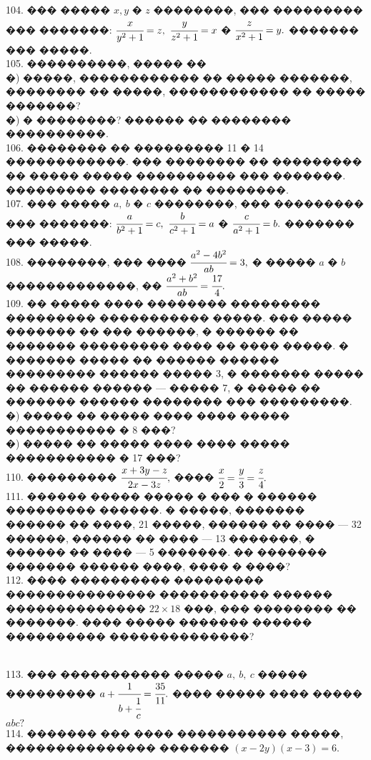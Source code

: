 \documentclass[12pt]{article}
\begin{document}
104. ��� ����� $x, y$ � $z$ ��������, ��� ��������� ��� �������: $\cfrac{x}{y^2+1}=z,\ \cfrac{y}{z^2+1}=x$ � $\cfrac{z}{x^2+1}=y.$ ������� ��� �����.\\
105. ����������, ����� ��\\
�) �����, ������������ �� ����� �������, �������� �� �����, ������������ �� ����� �������?\\
�) � ��������? ������ �� �������� ����������.\\
106. �������� �� ��������� 11 � 14 ������������. ��� �������� �� ��������� �� ����� ����� ���������� ��� �������. ��������� �������� �� ��������.\\
107. ��� ����� $a,\ b$ � $c$ ��������, ��� ��������� ��� �������: $\cfrac{a}{b^2+1}=c,\ \cfrac{b}{c^2+1}=a$ � $\cfrac{c}{a^2+1}=b.$ ������� ��� �����.\\
108. ��������, ��� ���� $\cfrac{a^2-4b^2}{ab}=3,$ � ����� $a$ � $b$ �������������, �� $\cfrac{a^2+b^2}{ab}=\cfrac{17}{4}.$\\
109. �� ����� ���� �������� ��������� ��������� ����������� �����. ��� ����� ������� �� ��� ������, � ������ �� ������� ��������� ���� �� ���� �����.
� ������� ����� �� ������ ������ ��������� ������ ����� 3, � ������� ����� �� ������ ������ --- ����� 7, � ����� �� ������� ������ �������� ��� ���������.\\
�) ����� �� ����� ���� ���� ����� ����������� � 8 ���?\\
�) ����� �� ����� ���� ���� ����� ����������� � 17 ���?\\
110. ��������� $\cfrac{x+3y-z}{2x-3z},$ ���� $\cfrac{x}{2}=\cfrac{y}{3}=\cfrac{z}{4}.$\\
111. ������ ����� ����� � ��� � ������ ��������� ������. � �����, ������� ������ �� ����, 21 �����, ������ �� ���� --- 32 ������, ������ �� ���� --- 13 �������, � ������ �� ���� --- 5 �������. �� ������� ������� ������ ����, ���� � ����?\\
112. ���� ���������� ��������� ��������������� ����������� ������ �������������� $22\times18$ ���, ��� �������� �� �������. ���� ����� ������� ������ ���������� ��������������?\\
\begin{figure}[ht!]
\end{figure}\\
113. ��� ����������� ����� $a,\ b,\ c$ ����� ��������� $a+\cfrac{1}{b+\cfrac{1}{c}}=\cfrac{35}{11}.$ ���� ����� ���� ����� $abc?$\\
114. ������� ��� ���� ����������� �����, ��������������� ������� $(x-2y)(x-3)=6.$\\
\end{document}
